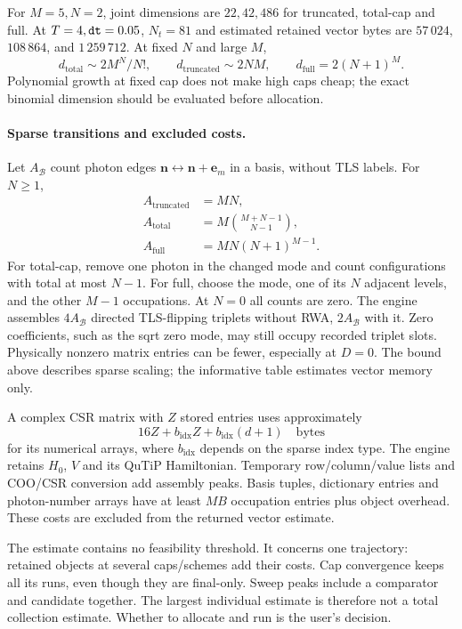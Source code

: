 \documentclass[11pt,a4paper]{article}
\newcommand{\code}[1]{\texttt{\detokenize{#1}}}
\newcommand{\B}{\mathcal B}
\begin{document}
For $M=5,N=2$, joint dimensions are $22,42,486$ for truncated, total-cap and
full. At $T=4,\code{dt}=0.05$, $N_t=81$ and estimated retained vector bytes
are $57\,024$, $108\,864$, and $1\,259\,712$. At fixed $N$ and large $M$,
\begin{equation}
 d_{\mathrm{total}}\sim2M^N/N!,\qquad
 d_{\mathrm{truncated}}\sim2NM,\qquad d_{\mathrm{full}}=2(N+1)^M.
\end{equation}
Polynomial growth at fixed cap does not make high caps cheap; the exact
binomial dimension should be evaluated before allocation.

\paragraph{Sparse transitions and excluded costs.}
Let $A_\B$ count photon edges $\bm n\leftrightarrow\bm n+\bm e_m$ in a
basis, without TLS labels. For $N\geq1$,
\begin{align}
 A_{\mathrm{truncated}}&=MN,\\
 A_{\mathrm{total}}&=M\binom{M+N-1}{N-1},\\
 A_{\mathrm{full}}&=MN(N+1)^{M-1}.
 \label{eq:edges}
\end{align}
For total-cap, remove one photon in the changed mode and count configurations
with total at most $N-1$. For full, choose the mode, one of its $N$ adjacent
levels, and the other $M-1$ occupations. At $N=0$ all counts are zero.
The engine assembles $4A_\B$ directed TLS-flipping triplets without RWA,
$2A_\B$ with it. Zero coefficients, such as the sqrt zero mode, may still
occupy recorded triplet slots. Physically nonzero matrix entries can be
fewer, especially at $D=0$. The bound above describes sparse scaling; the informative table estimates
vector memory only.

A complex CSR matrix with $Z$ stored entries uses approximately
\begin{equation}
 16Z+b_{\mathrm{idx}}Z+b_{\mathrm{idx}}(d+1)\quad\text{bytes}
 \label{eq:csrbytes}
\end{equation}
for its numerical arrays, where $b_{\mathrm{idx}}$ depends on the sparse
index type. The engine retains $H_0$, $V$ and its QuTiP Hamiltonian.
Temporary row/column/value lists and COO/CSR conversion add assembly peaks. Basis tuples, dictionary entries and
photon-number arrays have at least $MB$ occupation entries plus object
overhead. These costs are excluded from the returned vector estimate.

The estimate contains no feasibility threshold. It concerns one trajectory:
retained objects at several caps/schemes add their costs. Cap convergence keeps
all its runs, even though they are final-only. Sweep peaks include a comparator
and candidate together. The largest individual estimate is therefore not a
total collection estimate. Whether to allocate and run is the user's decision.
\end{document}
